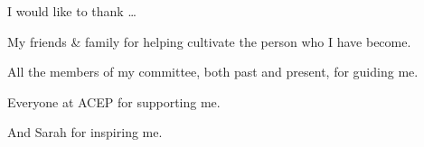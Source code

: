 \begin{acknowledgements}
	I would like to thank \dots
	
	 My friends \& family for helping cultivate the person who I have become. 
	 
	 All the members of my committee, both past and present, for guiding me. 
	 
	 Everyone at ACEP for supporting me. 
	 
	 And Sarah for inspiring me.
\end{acknowledgements}